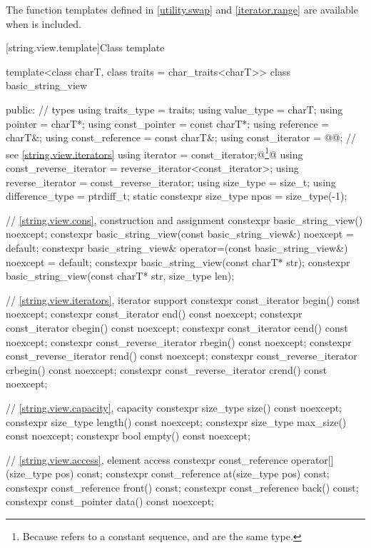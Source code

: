 \pnum
The function templates defined in \ref{utility.swap} and \ref{iterator.range}
are available when  is included.

[string.view.template]{Class template }

%
\begin{codeblock}
template<class charT, class traits = char_traits<charT>>
class basic_string_view {
public:
  // types
  using traits_type            = traits;
  using value_type             = charT;
  using pointer                = charT*;
  using const_pointer          = const charT*;
  using reference              = charT&;
  using const_reference        = const charT&;
  using const_iterator         = @@; // see \ref{string.view.iterators}
  using iterator               = const_iterator;@\footnote{Because  refers to a constant sequence,  and  are the same type.}@
  using const_reverse_iterator = reverse_iterator<const_iterator>;
  using reverse_iterator       = const_reverse_iterator;
  using size_type              = size_t;
  using difference_type        = ptrdiff_t;
  static constexpr size_type npos = size_type(-1);

  // \ref{string.view.cons}, construction and assignment
  constexpr basic_string_view() noexcept;
  constexpr basic_string_view(const basic_string_view&) noexcept = default;
  constexpr basic_string_view& operator=(const basic_string_view&) noexcept = default;
  constexpr basic_string_view(const charT* str);
  constexpr basic_string_view(const charT* str, size_type len);

  // \ref{string.view.iterators}, iterator support
  constexpr const_iterator begin() const noexcept;
  constexpr const_iterator end() const noexcept;
  constexpr const_iterator cbegin() const noexcept;
  constexpr const_iterator cend() const noexcept;
  constexpr const_reverse_iterator rbegin() const noexcept;
  constexpr const_reverse_iterator rend() const noexcept;
  constexpr const_reverse_iterator crbegin() const noexcept;
  constexpr const_reverse_iterator crend() const noexcept;

  // \ref{string.view.capacity}, capacity
  constexpr size_type size() const noexcept;
  constexpr size_type length() const noexcept;
  constexpr size_type max_size() const noexcept;
  constexpr bool empty() const noexcept;

  // \ref{string.view.access}, element access
  constexpr const_reference operator[](size_type pos) const;
  constexpr const_reference at(size_type pos) const;
  constexpr const_reference front() const;
  constexpr const_reference back() const;
  constexpr const_pointer data() const noexcept;

}
\end{codeblock}
